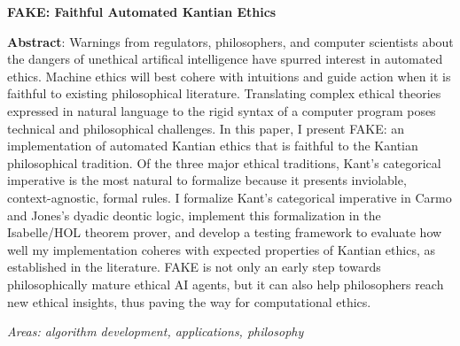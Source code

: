\documentclass[11pt]{article}
\begin{document}
\noindent \textbf{FAKE: Faithful Automated Kantian Ethics}

\medskip 

\noindent \textbf{Abstract}: Warnings from regulators, philosophers, and computer scientists about the 
dangers of unethical artifical intelligence have spurred interest in automated ethics. Machine 
ethics will best cohere with intuitions and guide action when it is faithful to existing philosophical
literature. Translating complex ethical theories expressed in natural language to the rigid syntax 
of a computer program poses technical and philosophical challenges. In 
this paper, I present FAKE: an implementation of automated Kantian 
ethics that is faithful to the Kantian philosophical tradition. Of the three major ethical 
traditions, Kant's categorical imperative is the most natural to formalize because it presents inviolable, 
context-agnostic, formal rules.  I formalize Kant's categorical imperative 
in Carmo and Jones's dyadic deontic logic, implement this formalization 
in the Isabelle/HOL theorem prover, and develop a testing framework to evaluate how well 
my implementation coheres with expected properties of Kantian ethics, as established in the literature. 
FAKE is not only an early step towards philosophically mature ethical AI agents, but it can also help
philosophers reach new ethical insights, thus paving the way for computational ethics.

\smallskip
\noindent \emph{Areas: algorithm development, applications, philosophy}
\end{document}
